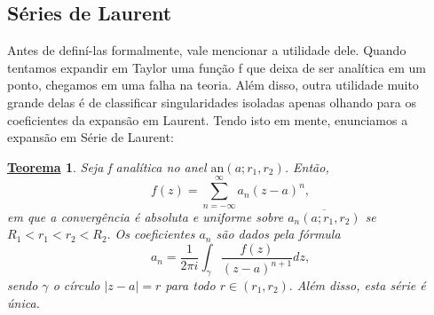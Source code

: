 \documentclass{article}
\newtheorem*{theorem*}{\underline{Teorema}}
\begin{document}
  \subsection{Séries de Laurent}
  Antes de definí-las formalmente, vale mencionar a utilidade dele. Quando tentamos expandir em Taylor uma função f que 
  deixa de ser analítica em um ponto, chegamos em uma falha na teoria. Além disso, outra utilidade muito grande delas é de classificar singularidades
  isoladas apenas olhando para os coeficientes da expansão em Laurent. Tendo isto em mente, enunciamos a expansão em Série de Laurent:
  \hypertarget{laurent}{
    \begin{theorem*}
      Seja f analítica no anel \(\mathrm{an}(a; r_{1}, r_{2})\). Então,
      \[
        f(z) = \sum\limits_{n=-\infty}^{\infty}a_{n}(z-a)^{n},
      \]
      em que a convergência é absoluta e uniforme sobre \(\overline{a_{n}(a; r_{1}, r_{2})}\) se 
      \(R_{1} < r_{1} < r_{2} < R_{2}.\) Os coeficientes \(a_{n}\) são dados pela fórmula 
      \[
        a_{n} = \frac{1}{2\pi i}\int_{\gamma }^{}\frac{f(z)}{(z-a)^{n+1}}dz,
      \]
      sendo \(\gamma \) o círculo \(|z-a|=r\) para todo \(r\in (r_{1}, r_{2}).\) Além disso, esta série é única.
  \end{theorem*}}
\end{document}
